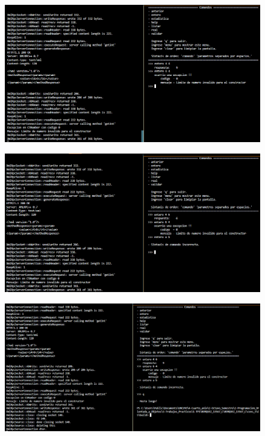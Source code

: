 \documentclass[a4paper,12pt]{article}
\begin{document}
\begin{figure}[htbp]
    \begin{adjustbox}{max width=\textwidth, center}
        \includegraphics{C5/Servidor_cliente_12.PNG}
    \end{adjustbox}
\end{figure}
\begin{figure}[htbp]
    \begin{adjustbox}{max width=\textwidth, center}
        \includegraphics{C5/Servidor_cliente_13.PNG}
    \end{adjustbox}
\end{figure}
\begin{figure}[htbp]
    \begin{adjustbox}{max width=\textwidth, center}
        \includegraphics{C5/Servidor_cliente_14.PNG}
    \end{adjustbox}
\end{figure}
\newpage
\end{document}
